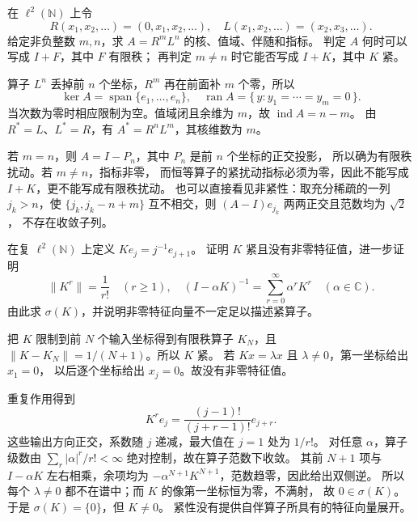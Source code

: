 \begin{exercise}\label{b1:ex:C1-shift-index}
在 \(\ell^2(\mathbb N)\) 上令
\[
 R(x_1,x_2,\ldots)=(0,x_1,x_2,\ldots),\quad
 L(x_1,x_2,\ldots)=(x_2,x_3,\ldots).
\]
给定非负整数 \(m,n\)，求 \(A=R^mL^n\) 的核、值域、伴随和指标。
判定 \(A\) 何时可以写成 \(I+F\)，其中 \(F\) 有限秩；
再判定 \(m\ne n\) 时它能否写成 \(I+K\)，其中 \(K\) 紧。
\end{exercise}
\begin{solution}
算子 \(L^n\) 丢掉前 \(n\) 个坐标，\(R^m\) 再在前面补 \(m\) 个零，所以
\[
 \ker A=\operatorname{span}\{e_1,\ldots,e_n\},\quad
 \operatorname{ran}A=\{\,y:y_1=\cdots=y_m=0\,\}.
\]
当次数为零时相应限制为空。值域闭且余维为 \(m\)，故
\(\operatorname{ind}A=n-m\)。
由 \(R^*=L\)、\(L^*=R\)，有 \(A^*=R^nL^m\)，其核维数为 \(m\)。

若 \(m=n\)，则 \(A=I-P_n\)，其中 \(P_n\) 是前 \(n\) 个坐标的正交投影，
所以确为有限秩扰动。若 \(m\ne n\)，指标非零，
而恒等算子的紧扰动指标必须为零，因此不能写成 \(I+K\)，更不能写成有限秩扰动。
也可以直接看见非紧性：取充分稀疏的一列 \(j_k>n\)，使
\(\{j_k,j_k-n+m\}\) 互不相交，则 \((A-I)e_{j_k}\) 两两正交且范数均为 \(\sqrt2\)，
不存在收敛子列。
\end{solution}

\begin{exercise}\label{b1:ex:C1-weighted-shift}
在复 \(\ell^2(\mathbb N)\) 上定义 \(Ke_j=j^{-1}e_{j+1}\)。
证明 \(K\) 紧且没有非零特征值，进一步证明
\[
 \|K^r\|=\frac1{r!}\quad(r\geq1),\quad
 (I-\alpha K)^{-1}=\sum_{r=0}^{\infty}\alpha^rK^r
 \quad(\alpha\in\mathbb C).
\]
由此求 \(\sigma(K)\)，并说明非零特征向量不一定足以描述紧算子。
\end{exercise}
\begin{solution}
把 \(K\) 限制到前 \(N\) 个输入坐标得到有限秩算子 \(K_N\)，且
\(\|K-K_N\|=1/(N+1)\)。所以 \(K\) 紧。
若 \(Kx=\lambda x\) 且 \(\lambda\ne0\)，第一坐标给出 \(x_1=0\)，
以后逐个坐标给出 \(x_j=0\)。故没有非零特征值。

重复作用得到
\[
 K^re_j=\frac{(j-1)!}{(j+r-1)!}e_{j+r}.
\]
这些输出方向正交，系数随 \(j\) 递减，最大值在 \(j=1\) 处为 \(1/r!\)。
对任意 \(\alpha\)，算子级数由
\(\sum_r|\alpha|^r/r!<\infty\) 绝对控制，故在算子范数下收敛。
其前 \(N+1\) 项与 \(I-\alpha K\) 左右相乘，余项均为
\(-\alpha^{N+1}K^{N+1}\)，范数趋零，因此给出双侧逆。
所以每个 \(\lambda\ne0\) 都不在谱中；而 \(K\) 的像第一坐标恒为零，不满射，
故 \(0\in\sigma(K)\)。于是 \(\sigma(K)=\{0\}\)，但 \(K\ne0\)。
紧性没有提供自伴算子所具有的特征向量展开。
\end{solution}

